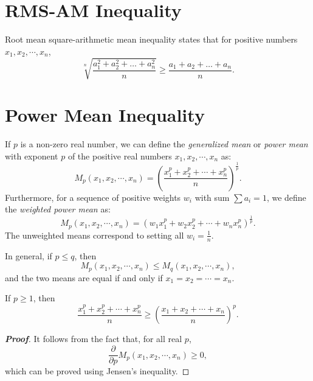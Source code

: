 \documentclass[a4paper]{report}
\begin{document}
    \par  \ \par \ 
\section{RMS-AM Inequality}
\begin{thr}
Root mean square-arithmetic mean inequality states that for positive numbers $x_1,x_2,\cdots,x_n$,
\begin{equation}	\sqrt[n]{\frac{a_1^2+a_2^2+\dots+a_n^2}{n}}
		\geqslant\frac{a_1+a_2+\dots+a_n}{n}.
\end{equation}
\end{thr}
\par\;\par

\section{Power Mean Inequality}
\begin{defi}
If $p$ is a non-zero real number, we can define the \emph{generalized mean} or \emph{power mean} with exponent $p$ of the positive real numbers $x_1, x_2,\cdots, x_n$ as:
\[
M_p(x_1, x_2,\cdots, x_n)=\left( \frac{x^{p}_{1}+x^{p}_{2}+\cdots +x^{p}_{n}}{n} \right) ^{\frac{1}{p} }.
\]
Furthermore, for a sequence of positive weights $w_i$ with sum $\sum a_i =1$, we define the \emph{weighted power mean} as:
\[
M_{p}(x_{1},x_{2},\cdots ,x_{n}) =\left( w_{1}x^{p}_{1}+w_{2}x^{p}_{2}+\cdots +w_{n}x^{p}_{n}\right) ^{\frac{1}{p} }.
\]
The unweighted means correspond to setting all $w_i= \frac{1}{n}$.
\end{defi}
\par \quad
\begin{thr}
In general, if $p\le q$, then 
\begin{equation}
M_p(x_1, x_2,\cdots, x_n) \leqslant
M_q(x_1, x_2,\cdots, x_n) ,
\end{equation}
and the two means are equal if and only if $x_1= x_2= \cdots = x_n$.
\end{thr}

If $p\ge 1$, then
\[\frac{x^{p}_{1}+x^{p}_{2}+\cdots +x^{p}_{n}}{n}\geqslant
\left( \frac{x_{1}+x_{2}+\cdots +x_{n}}{n} \right) ^{p}.\]

\begin{proof}[\bf{Proof}]
It follows from the fact that, for all real $p$,
\[\frac{\partial }{\partial p} M_{p}(x_1, x_2,\cdots, x_n)\geqslant0,\]
which can be proved using Jensen's inequality.
\end{proof}
\end{document}
